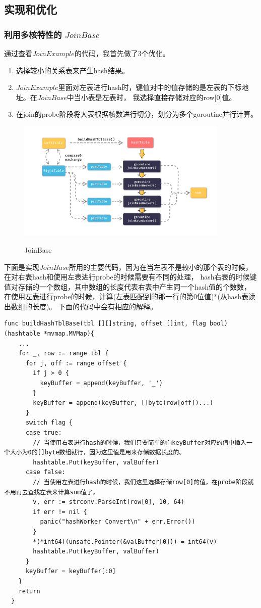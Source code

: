 \documentclass[UTF8]{ctexart}
\begin{document}
\subsection{实现和优化}
\subsubsection{利用多核特性的 $JoinBase$}
通过查看$JoinExample$的代码，我首先做了3个优化。
\begin{enumerate}
  \item 选择较小的关系表来产生hash结果。
  \item $JoinExample$里面对左表进行hash时，键值对中的值存储的是左表的下标地址。在$JoinBase$中当小表是左表时，
  我选择直接存储对应的row[0]值。
  \item 在join的probe阶段将大表根据核数进行切分，划分为多个goroutine并行计算。
\end{enumerate}
\begin{figure}[H]
  \centering
  \includegraphics[width=0.9\textwidth]{fig/base.pdf}\\
  \caption{JoinBase}
  \label{joinbase}
\end{figure}

下面是实现$JoinBase$所用的主要代码，因为在当左表不是较小的那个表的时候，在对右表hash和使用左表进行probe的时候需要有不同的处理，
hash右表的时候键值对存储的一个数组，其中数组的长度代表右表中产生同一个hash值的个数数，在使用左表进行probe的时候，计算(左表匹配到的那一行的第0位值)*(从hash表读出数组的长度)。
下面的代码中会有相应的解释。
\begin{lstlisting}[language={Golang}]
  func buildHashTblBase(tbl [][]string, offset []int, flag bool) (hashtable *mvmap.MVMap){
    ...
    for _, row := range tbl {
      for j, off := range offset {
        if j > 0 {
          keyBuffer = append(keyBuffer, '_')
        }
        keyBuffer = append(keyBuffer, []byte(row[off])...)
      }
      switch flag {
      case true:
        // 当使用右表进行hash的时候，我们只要简单的向keyBuffer对应的值中插入一个大小为0的[]byte数组就行，因为这里值是用来存储数据长度的。
        hashtable.Put(keyBuffer, valBuffer)
      case false:
        // 当使用左表进行hash的时候，我们这里选择存储row[0]的值，在probe阶段就不用再去查找左表来计算sum值了。
        v, err := strconv.ParseInt(row[0], 10, 64)
        if err != nil {
          panic("hashWorker Convert\n" + err.Error())
        }
        *(*int64)(unsafe.Pointer(&valBuffer[0])) = int64(v)
        hashtable.Put(keyBuffer, valBuffer)
      }
      keyBuffer = keyBuffer[:0]
    }
    return
  }
\end{lstlisting}
\end{document}
